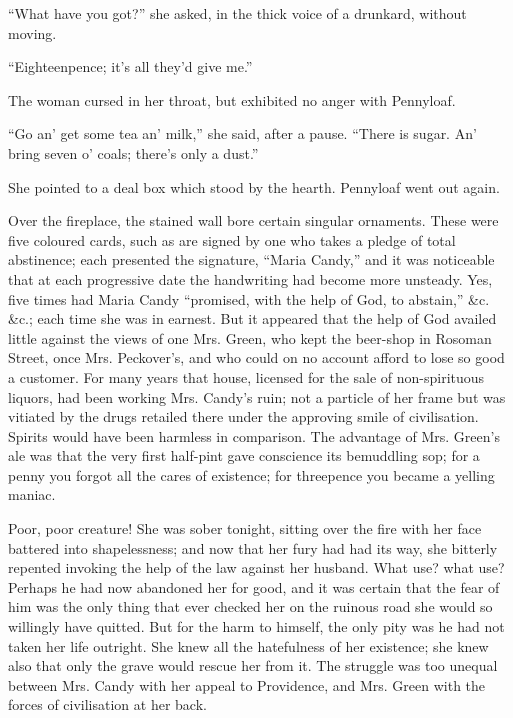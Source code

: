 ``What have you got?'' she asked, in {\protect\hypertarget{182}{}{}}the
thick voice of a drunkard, without moving.

``Eighteenpence; it's all they'd give me.''

The woman cursed in her throat, but exhibited no anger with Pennyloaf.

``Go an' get some tea an' milk,'' she said, after a pause. ``There is
sugar. An' bring seven o' coals; there's only a dust.''

She pointed to a deal box which stood by the hearth. Pennyloaf went out
again.

Over the fireplace, the stained wall bore certain singular ornaments.
These were five coloured cards, such as are signed by one who takes a
pledge of total abstinence; each presented the signature, ``Maria
Candy,'' and it was noticeable that at each progressive date the
handwriting had become more unsteady. Yes, five times had Maria Candy
``promised, with the help of God, to abstain,'' \&c. \&c.; each time she
was in earnest. But it appeared that the help of God availed little
against the views of one Mrs. Green, who kept the beer-shop in Rosoman
Street, once Mrs. Peckover's, and who could on no account
{\protect\hypertarget{183}{}{}}afford to lose so good a customer. For
many years that house, licensed for the sale of non-spirituous liquors,
had been working Mrs. Candy's ruin; not a particle of her frame but was
vitiated by the drugs retailed there under the approving smile of
civilisation. Spirits would have been harmless in comparison. The
advantage of Mrs. Green's ale was that the very first half-pint gave
conscience its bemuddling sop; for a penny you forgot all the cares of
existence; for threepence you became a yelling maniac.

Poor, poor creature! She was sober tonight, sitting over the fire with
her face battered into shapelessness; and now that her fury had had its
way, she bitterly repented invoking the help of the law against her
husband. What use? what use? Perhaps he had now abandoned her for good,
and it was certain that the fear of him was the only thing that ever
checked her on the ruinous road she would so willingly have quitted. But
for the harm to himself, the only pity was he had not taken her life
outright. She knew all the {\protect\hypertarget{184}{}{}}hatefulness of
her existence; she knew also that only the grave would rescue her from
it. The struggle was too unequal between Mrs. Candy with her appeal to
Providence, and Mrs. Green with the forces of civilisation at her back.


